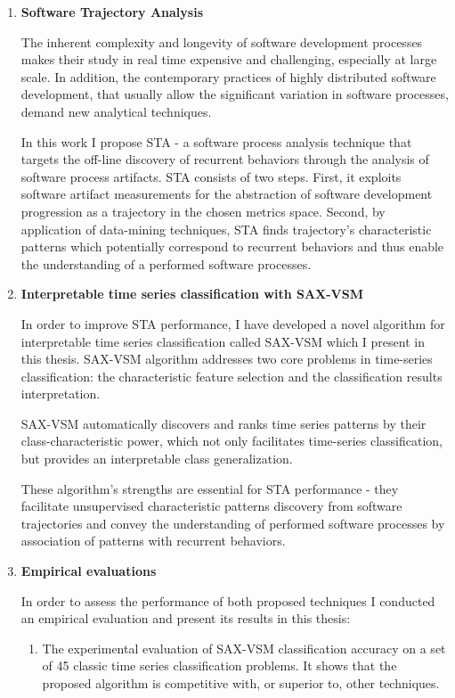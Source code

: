 \begin{enumerate}

\item \textbf{Software Trajectory Analysis}

The inherent complexity and longevity of software development processes makes their study in real time
expensive and challenging, especially at large scale. 
In addition, the contemporary practices of highly distributed software development, that usually allow 
the significant variation in software processes, demand new analytical techniques.

In this work I propose STA - a software process analysis technique that targets the off-line discovery 
of recurrent behaviors through the analysis of software process artifacts. 
STA consists of two steps. 
First, it exploits software artifact measurements for the abstraction of software development 
progression as a trajectory in the chosen metrics space. 
Second, by application of data-mining techniques, STA finds trajectory's characteristic 
patterns which potentially correspond to recurrent behaviors and thus enable the understanding of a 
performed software processes.

\item \textbf{Interpretable time series classification with SAX-VSM}

In order to improve STA performance, I have developed a novel algorithm for interpretable time 
series classification called SAX-VSM which I present in this thesis. 
SAX-VSM algorithm addresses two core problems in time-series classification: 
the characteristic feature selection and the classification results interpretation. 

SAX-VSM  automatically discovers and ranks time series patterns by their
class-characteristic power, which not only facilitates time-series classification, but provides an 
interpretable class generalization.

These algorithm's strengths are essential for STA performance - they facilitate unsupervised characteristic 
patterns discovery from software trajectories and convey the understanding of performed software processes 
by association of patterns with recurrent behaviors.

\item \textbf{Empirical evaluations}

In order to assess the performance of both proposed techniques I conducted an empirical evaluation and 
present its results in this thesis:
\begin{enumerate}
 \item The experimental evaluation of SAX-VSM classification accuracy on a set of 45 classic time series 
classification problems. It shows that the proposed algorithm is competitive with, or superior
to, other 
techniques.


\end{enumerate}
\end{enumerate}

